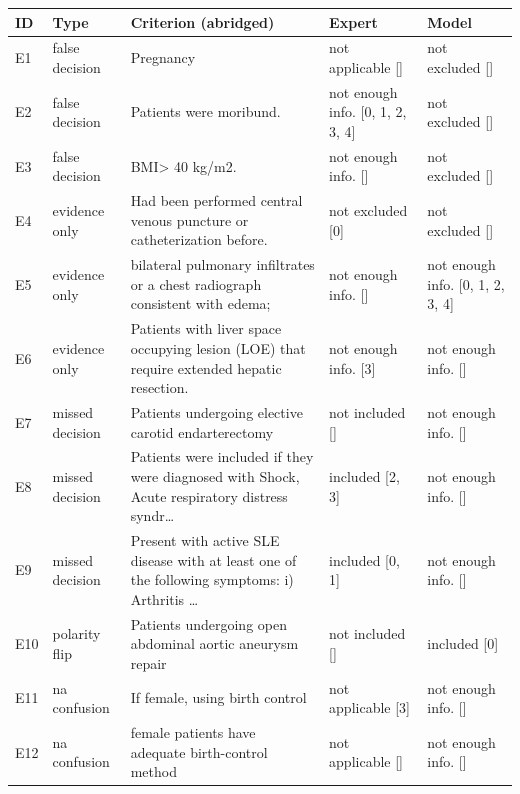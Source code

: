 \begin{tabular}{p{.05\linewidth}p{.15\linewidth}p{.32\linewidth}p{.13\linewidth}p{.13\linewidth}}\toprule
ID & Type & Criterion (abridged) & Expert & Model \\\midrule
E1 & false decision & Pregnancy & not applicable [] & not excluded [] \\
E2 & false decision & Patients were moribund. & not enough info. [0, 1, 2, 3, 4] & not excluded [] \\
E3 & false decision & BMI> 40 kg/m2. & not enough info. [] & not excluded [] \\
E4 & evidence only & Had been performed central venous puncture or catheterization before. & not excluded [0] & not excluded [] \\
E5 & evidence only & bilateral pulmonary infiltrates or a chest radiograph consistent with edema; & not enough info. [] & not enough info. [0, 1, 2, 3, 4] \\
E6 & evidence only & Patients with liver space occupying lesion (LOE) that require extended hepatic resection. & not enough info. [3] & not enough info. [] \\
E7 & missed decision & Patients undergoing elective carotid endarterectomy & not included [] & not enough info. [] \\
E8 & missed decision & Patients were included if they were diagnosed with Shock, Acute respiratory distress syndr… & included [2, 3] & not enough info. [] \\
E9 & missed decision & Present with active SLE disease with at least one of the following symptoms: i) Arthritis … & included [0, 1] & not enough info. [] \\
E10 & polarity flip & Patients undergoing open abdominal aortic aneurysm repair & not included [] & included [0] \\
E11 & na confusion & If female, using birth control & not applicable [3] & not enough info. [] \\
E12 & na confusion & female patients have adequate birth-control method & not applicable [] & not enough info. [] \\
\bottomrule\end{tabular}
